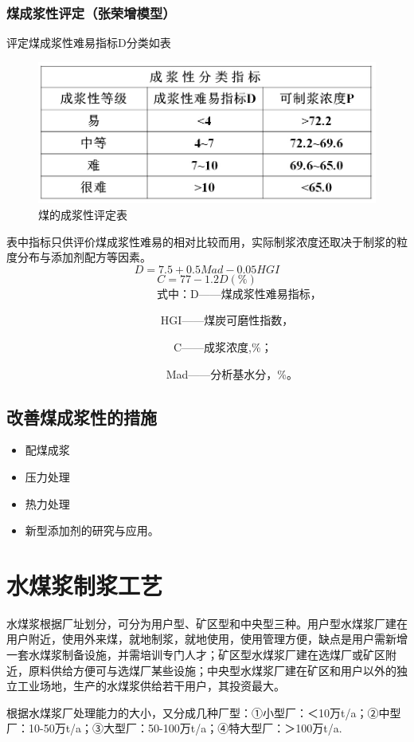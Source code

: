 \documentclass[10pt,openany]{ctexbook}
\begin{document}
\subsubsection{煤成浆性评定（张荣增模型）}
评定煤成浆性难易指标D分类如表
 \begin{figure}[!ht]
\includegraphics[scale=0.7]{30}
\caption{煤的成浆性评定表 }
\end{figure}
表中指标只供评价煤成浆性难易的相对比较而用，实际制浆浓度还取决于制浆的粒度分布与添加剂配方等因素。
$$D=7.5+0.5Mad-0.05HGI $$
$$C=77-1.2D(\%) $$
~~~~~~~~~~~~~~~~~~~~~~~~~~~式中：D——煤成浆性难易指标，\par
 ~~~~~~~~~~~~~~~~~~~~~~~~~~~ HGI——煤炭可磨性指数，\par
  ~~~~~~~~~~~~~~~~~~~~~~~~~~~~~~C——成浆浓度,\%；\par
 ~~~~~~~~~~~~~~~~~~~~~~~~~~~~ Mad——分析基水分，\%。
\subsection{改善煤成浆性的措施}
\begin{itemize}
\item 配煤成浆
 \item 压力处理
\item 热力处理
\item 新型添加剂的研究与应用。

\end{itemize}
\section{水煤浆制浆工艺}
水煤浆根据厂址划分，可分为用户型、矿区型和中央型三种。用户型水煤浆厂建在用户附近，使用外来煤，就地制浆，就地使用，使用管理方便，缺点是用户需新增一套水煤浆制备设施，并需培训专门人才；矿区型水煤浆厂建在选煤厂或矿区附近，原料供给方便可与选煤厂某些设施；中央型水煤浆厂建在矿区和用户以外的独立工业场地，生产的水煤浆供给若干用户，其投资最大。\par
    根据水煤浆厂处理能力的大小，又分成几种厂型：①小型厂：＜10万t/a；②中型厂：10-50万t/a；③大型厂：50-100万t/a；④特大型厂：＞100万t/a.
\end{document}
